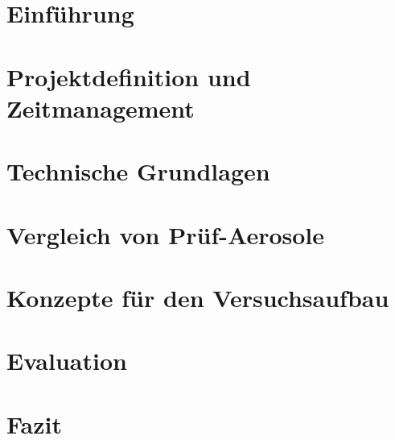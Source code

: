 \chapter{Einf\"{u}hrung}




\chapter{Projektdefinition und Zeitmanagement}\label{ch:project}




\chapter{Technische Grundlagen}\label{ch:foundations}





\chapter{Vergleich von Pr\"{u}f-Aerosole}\label{ch:aerosol}






\chapter{Konzepte f\"{u}r den Versuchsaufbau}\label{ch:concepts}










\chapter{Evaluation}\label{ch:evaluation}




\chapter{Fazit}\label{ch:conclusion}




